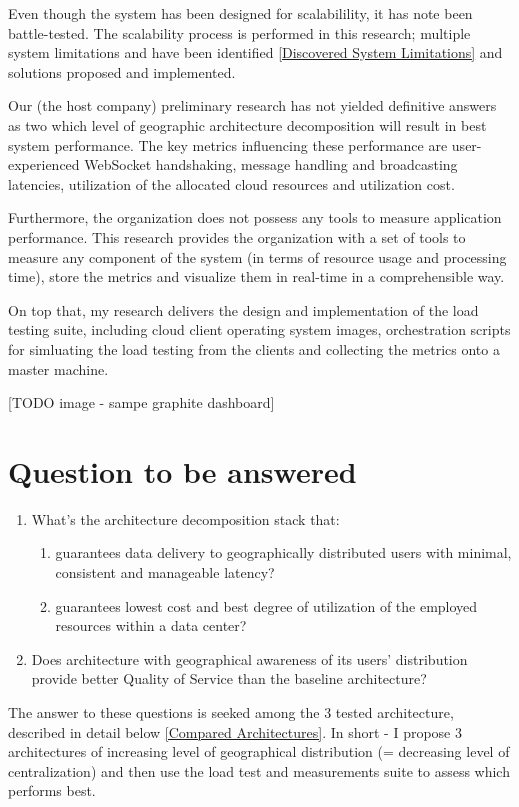 \documentclass{uvamscse}
\begin{document}
Even though the system has been designed for scalabilility, it has note been battle-tested. The scalability process is performed in this research; multiple system limitations and have been identified \ref{Discovered System Limitations} and solutions proposed and implemented.

Our (the host company) preliminary research has not yielded definitive answers as two which level of geographic architecture decomposition will result in best system performance. The key metrics influencing these performance are user-experienced WebSocket handshaking, message handling and broadcasting latencies, utilization of the allocated cloud resources and utilization cost.

Furthermore, the organization does not possess any tools to measure application performance. This research provides the organization with a set of tools to measure any component of the system (in terms of resource usage and processing time), store the metrics and visualize them in real-time in a comprehensible way.

On top that, my research delivers the design and implementation of the load testing suite, including cloud client operating system images, orchestration scripts for simluating the load testing from the clients and collecting the metrics onto a master machine.

[TODO image - sampe graphite dashboard]

\section{Question to be answered}
\begin{enumerate}
  \item What's the architecture decomposition stack that:
    \begin{enumerate}
      \item guarantees data delivery to geographically distributed users with minimal, consistent and manageable latency?
      \item guarantees lowest cost and best degree of utilization of the employed resources within a data center?
    \end{enumerate}
  \item Does architecture with geographical awareness of its users' distribution provide better Quality of Service than the baseline architecture?
\end{enumerate}

The answer to these questions is seeked among the 3 tested architecture, described in detail below \ref{Compared Architectures}. In short - I propose 3 architectures of increasing level of geographical distribution (= decreasing level of centralization) and then use the load test and measurements suite to assess which performs best.
\end{document}
